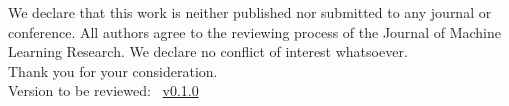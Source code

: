 \documentclass[twoside,11pt]{article}
\begin{document}
We declare that this work is neither published nor submitted to any journal or conference.
All authors agree to the reviewing process of the Journal of Machine Learning Research.
We declare no conflict of interest whatsoever.\\

Thank you for your consideration.\\

Version to be reviewed: \DPPy\ \href{https://github.com/guilgautier/DPPy/tags}{v0.1.0}
\end{document}
